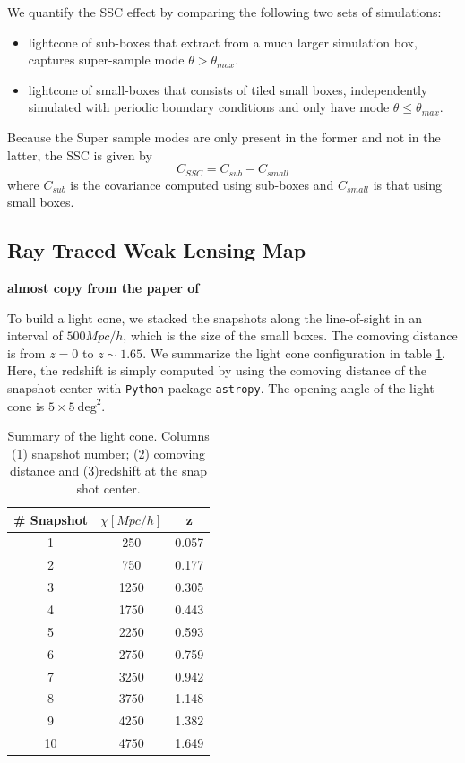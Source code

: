 \documentclass[fleqn,usenatbib]{mnras}
\begin{document}
We quantify the SSC effect by comparing the following two sets of simulations:
\begin{itemize}
    \item lightcone of sub-boxes that extract from a much larger simulation box, captures super-sample mode $\theta > \theta_{max}$.
    \item lightcone of small-boxes that consists of tiled small boxes, independently simulated with periodic boundary conditions and only have mode $\theta \leq \theta_{max}$.
\end{itemize}

Because the Super sample modes are only present in the former and not in the latter, the SSC is given by 
\begin{equation}
    C_{SSC} = C_{sub} - C_{small}
\end{equation}
where $C_{sub}$ is the covariance computed using sub-boxes and $C_{small}$ is that using small boxes.

\subsection{Ray Traced Weak Lensing Map}
\textbf{almost copy from the paper of \cite{10.1093/mnras/stab395}}

To build a light cone, we stacked the snapshots along the line-of-sight in an interval of $500 Mpc/h$, which is the size of the small boxes. 
The comoving distance is from $z=0$ to $z\sim1.65$.
We summarize the light cone configuration in table \ref{tab:config}.
Here, the redshift is simply computed by using the comoving distance of the snapshot center with \texttt{Python} package \texttt{astropy}.
The opening angle of the light cone is $5\times5\ \mathrm{deg}^2$. 
\begin{table}
    \centering
    \caption{Summary of the light cone. Columns (1) snapshot number; (2) comoving distance and (3)redshift at the snap shot center.}
    \label{tab:config}
    \begin{tabular}{ccc}
        \# Snapshot & $\chi [Mpc/h]$ & z \\ \hline\hline
        1 & 250 & 0.057 \\
        2 & 750 & 0.177 \\
        3 & 1250 & 0.305 \\
        4 & 1750 & 0.443 \\
        5 & 2250 & 0.593 \\
        6 & 2750 & 0.759 \\
        7 & 3250 & 0.942 \\
        8 & 3750 & 1.148 \\
        9 & 4250 & 1.382 \\
        10 & 4750 & 1.649 \\ \hline
    \end{tabular}
\end{table}
\end{document}
